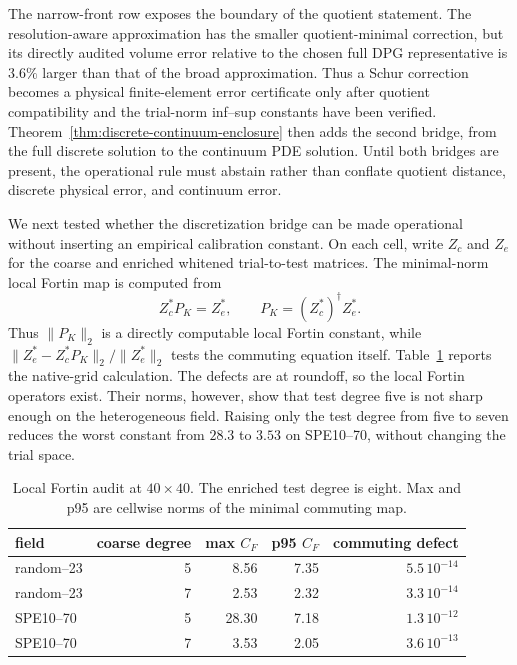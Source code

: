 \documentclass[11pt]{article}
\numberwithin{algorithm}{section}
\theoremstyle{definition}\newtheorem{definition}[theorem]{Definition}
\theoremstyle{remark}\newtheorem{remark}[theorem]{Remark}
\begin{document}
The narrow-front row exposes the boundary of the quotient statement.  The
resolution-aware approximation has the smaller quotient-minimal correction,
but its directly audited volume error relative to the chosen full DPG
representative is $3.6\%$ larger than that of the broad approximation.  Thus a
Schur correction becomes a physical finite-element error certificate only
after quotient compatibility and the trial-norm inf--sup constants have been
verified.  Theorem~\ref{thm:discrete-continuum-enclosure} then adds the second
bridge, from the full discrete solution to the continuum PDE solution.  Until
both bridges are present, the operational rule must abstain rather than
conflate quotient distance, discrete physical error, and continuum error.

We next tested whether the discretization bridge can be made operational
without inserting an empirical calibration constant.  On each cell, write
$Z_c$ and $Z_e$ for the coarse and enriched whitened trial-to-test matrices.
The minimal-norm local Fortin map is computed from
\[
 Z_c^*P_K=Z_e^*,\qquad P_K=(Z_c^*)^\dagger Z_e^*.
\]
Thus $\|P_K\|_2$ is a directly computable local Fortin constant, while
$\|Z_e^*-Z_c^*P_K\|_2/\|Z_e^*\|_2$ tests the commuting equation itself.
Table~\ref{tab:fortin-audit} reports the native-grid calculation.  The defects
are at roundoff, so the local Fortin operators exist.  Their norms, however,
show that test degree five is not sharp enough on the heterogeneous field.
Raising only the test degree from five to seven reduces the worst constant
from $28.3$ to $3.53$ on SPE10--70, without changing the trial space.

\begin{table}[t]
\centering
\caption{Local Fortin audit at $40\times40$.  The enriched test degree is
eight.  Max and p95 are cellwise norms of the minimal commuting map.}
\label{tab:fortin-audit}
\begin{tabular}{lrrrr}
\toprule
field & coarse degree & max $C_F$ & p95 $C_F$ & commuting defect\\
\midrule
random--23 & 5 & 8.56 & 7.35 & $5.5\,10^{-14}$\\
random--23 & 7 & 2.53 & 2.32 & $3.3\,10^{-14}$\\
SPE10--70  & 5 & 28.30 & 7.18 & $1.3\,10^{-12}$\\
SPE10--70  & 7 & 3.53 & 2.05 & $3.6\,10^{-13}$\\
\bottomrule
\end{tabular}
\end{table}
\end{document}
